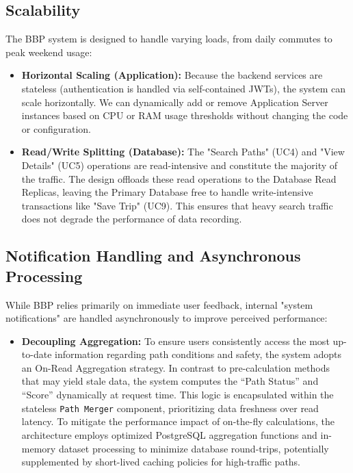 \subsection{Scalability}
The BBP system is designed to handle varying loads, from daily commutes to peak weekend usage:
\begin{itemize}
    \item \textbf{Horizontal Scaling (Application):} Because the backend services are stateless (authentication is handled via self-contained JWTs), the system can scale horizontally. We can dynamically add or remove Application Server instances based on CPU or RAM usage thresholds without changing the code or configuration.
    \item \textbf{Read/Write Splitting (Database):} The "Search Paths" (UC4) and "View Details" (UC5) operations are read-intensive and constitute the majority of the traffic. The design offloads these read operations to the Database Read Replicas, leaving the Primary Database free to handle write-intensive transactions like "Save Trip" (UC9). This ensures that heavy search traffic does not degrade the performance of data recording.
\end{itemize}

\subsection{Notification Handling and Asynchronous Processing}
While BBP relies primarily on immediate user feedback, internal "system notifications" are handled asynchronously to improve perceived performance:
\begin{itemize}
    \item \textbf{Decoupling Aggregation:} To ensure users consistently access the most up-to-date information regarding path conditions and safety, the system adopts an On-Read Aggregation strategy. In contrast to pre-calculation methods that may yield stale data, the system computes the ``Path Status'' and ``Score'' dynamically at request time. This logic is encapsulated within the stateless \texttt{Path Merger} component, prioritizing data freshness over read latency. To mitigate the performance impact of on-the-fly calculations, the architecture employs optimized PostgreSQL aggregation functions and in-memory dataset processing to minimize database round-trips, potentially supplemented by short-lived caching policies for high-traffic paths.
\end{itemize}

